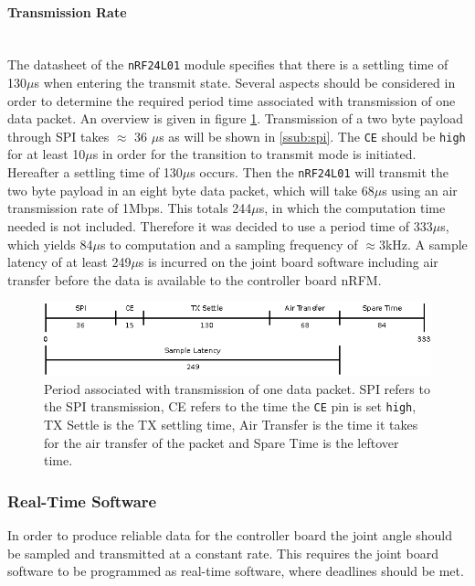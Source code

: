 \paragraph{Transmission Rate} %
\label{par:transmission_rate}~\\
The datasheet of the \texttt{nRF24L01} module specifies that there is a settling time of 130$\mu$s when entering the transmit state.
Several aspects should be considered in order to determine the required period time associated with transmission of one data packet.
An overview is given in figure \ref{fig:tiny_period}.
Transmission of a two byte payload through SPI takes $\approx$ 36 $\mu$s as will be shown in \ref{ssub:spi}.
The \texttt{CE} should be \texttt{high} for at least 10$\mu$s in order for the transition to transmit mode is initiated.
Hereafter a settling time of 130$\mu$s occurs.
Then the \texttt{nRF24L01} will transmit the two byte payload in an eight byte data packet, which will take 68$\mu$s using an air transmission rate of 1Mbps.
This totals 244$\mu$s, in which the computation time needed is not included.
Therefore it was decided to use a period time of 333$\mu$s, which yields 84$\mu$s to computation and a sampling frequency of $\approx$3kHz.
A sample latency of at least 249$\mu$s is incurred on the joint board software including air transfer before the data is available to the controller board nRFM.
\begin{figure}[h]
	\centering
	\includegraphics[width=1\linewidth]{graphics/latency_diagram}
	\caption[Period of wireless transmission]{Period associated with transmission of one data packet. SPI refers to the SPI transmission, CE refers to the time the \texttt{CE} pin is set \texttt{high}, TX Settle is the TX settling time, Air Transfer is the time it takes for the air transfer of the packet and Spare Time is the leftover time.}
	\label{fig:tiny_period}
\end{figure}

\subsubsection{Real-Time Software}
In order to produce reliable data for the controller board the joint angle should be sampled and transmitted at a constant rate.
This requires the joint board software to be programmed as real-time software, where deadlines should be met.

